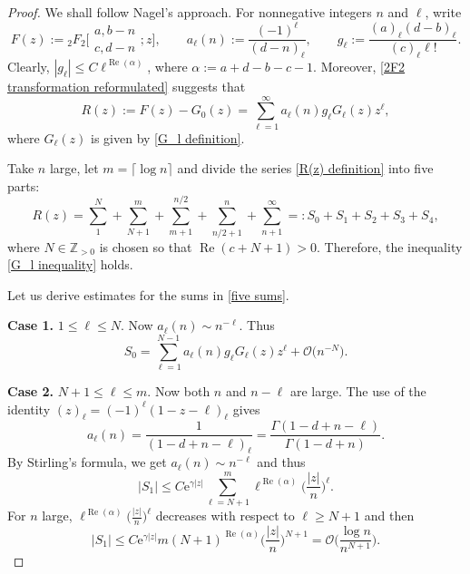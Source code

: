 \documentclass[11pt]{article}
\numberwithin{equation}{section}
\numberwithin{equation}{section}
\newcommand{\ZZ}{\ensuremath{\mathbb{Z}}}
\newcommand{\mo}{\mathcal{O}}
\begin{document}
\begin{proof}
	We shall follow Nagel's approach. For nonnegative integers $n$ and $\ell$, write
	\[F(z):={}_2F_2\biggl[\begin{matrix}
		a,b-n\\
		c,d-n
	\end{matrix};z\biggr],\qquad a_{\ell}(n):=\frac{(-1)^{\ell}}{(d-n)_{\ell}},\qquad g_{\ell}:=\frac{(a)_{\ell}(d-b)_{\ell}}{(c)_{\ell}\ell!}.\]
	Clearly, $\left|g_\ell\right|\leqslant C\ell^{\operatorname{Re}(\alpha)}$, where $\alpha:=a+d-b-c-1$. Moreover, \eqref{2F2 transformation reformulated} suggests that
	\begin{equation}\label{R(z) definition}
		R(z):=F(z)-G_0(z)=\sum_{\ell=1}^{\infty}a_\ell(n)g_\ell G_\ell(z)z^{\ell},
	\end{equation}
	where $G_\ell(z)$ is given by \eqref{G_l definition}.
	
	Take $n$ large, let $m=\lceil \log n\rceil$ and divide the series \eqref{R(z) definition} into five parts:
	\begin{equation}\label{five sums}
		R(z)=\sum_{1}^{N}+\sum_{N+1}^m+\sum_{m+1}^{n/2}+\sum_{n/2+1}^n+\sum_{n+1}^{\infty}=:S_0+S_1+S_2+S_3+S_4,
	\end{equation}
	where $N\in\ZZ_{>0}$ is chosen so that $\operatorname{Re}(c+N+1)>0$. Therefore, the inequality \eqref{G_l inequality} holds.
	
	Let us derive estimates for the sums in \eqref{five sums}.
	
	\textbf{Case 1.} $1\leqslant \ell\leqslant N$. Now $a_\ell(n)\sim n^{-\ell}$. Thus
	\[S_0=\sum_{\ell=1}^{N-1}a_\ell(n)g_\ell G_\ell(z)z^{\ell}+\mo\big(n^{-N}\big).\]
	
	\textbf{Case 2.} $N+1\leqslant\ell\leqslant m$. Now both $n$ and $n-\ell$ are large. The use of the identity $(z)_\ell=(-1)^{\ell}(1-z-\ell)_{\ell}$ gives
	\begin{equation}\label{a_l(n) identity}
		a_\ell(n)=\frac{1}{(1-d+n-\ell)_\ell}=\frac{\Gamma(1-d+n-\ell)}{\Gamma(1-d+n)}.
	\end{equation}
	By Stirling's formula, we get $a_\ell(n)\sim n^{-\ell}$ and thus
	\[|S_1|\leqslant C\mathrm{e}^{\gamma|z|}\sum_{\ell=N+1}^{m}\ell^{\operatorname{Re}(\alpha)}\biggl(\frac{|z|}{n}\biggr)^{\ell}.\]
	For $n$ large, $\ell^{\operatorname{Re}(\alpha)}\big(\frac{|z|}{n}\big)^{\ell}$ decreases with respect to $\ell\geqslant N+1$ and then
	\[|S_1|\leqslant C\mathrm{e}^{\gamma|z|}m(N+1)^{\operatorname{Re}(\alpha)}\biggl(\frac{|z|}{n}\biggr)^{N+1}=\mo\biggl(\frac{\log n}{n^{N+1}}\biggr).\]
	

\end{proof}
\end{document}
